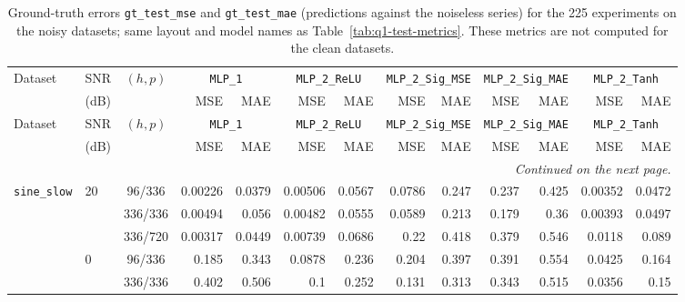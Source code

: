 \documentclass[12pt]{article}
\theoremstyle{definition}
\begin{document}
{\begin{enumerate}[label=\textbf{1.2.\arabic*}, leftmargin=*]
{\medskip
\begin{longtable}{@{}llc@{\hspace{6pt}}rr@{\hspace{8pt}}rr@{\hspace{8pt}}rr@{\hspace{8pt}}rr@{\hspace{8pt}}rr@{}}
\caption{Ground-truth errors \texttt{gt\_test\_mse} and \texttt{gt\_test\_mae} (predictions against the noiseless series) for the 225 experiments on the noisy datasets; same layout and model names as Table~\ref{tab:q1-test-metrics}. These metrics are not computed for the clean datasets.}\label{tab:q1-gt-metrics}\\
\toprule
Dataset & SNR & $(h,p)$ & \multicolumn{2}{c}{\texttt{MLP\_1}} & \multicolumn{2}{c}{\texttt{MLP\_2\_ReLU}} & \multicolumn{2}{c}{\texttt{MLP\_2\_Sig\_MSE}} & \multicolumn{2}{c}{\texttt{MLP\_2\_Sig\_MAE}} & \multicolumn{2}{c}{\texttt{MLP\_2\_Tanh}} \\
\cmidrule(lr){4-5}\cmidrule(lr){6-7}\cmidrule(lr){8-9}\cmidrule(lr){10-11}\cmidrule(lr){12-13}
 & (dB) &  & MSE & MAE & MSE & MAE & MSE & MAE & MSE & MAE & MSE & MAE \\
\midrule
\endfirsthead
\toprule
Dataset & SNR & $(h,p)$ & \multicolumn{2}{c}{\texttt{MLP\_1}} & \multicolumn{2}{c}{\texttt{MLP\_2\_ReLU}} & \multicolumn{2}{c}{\texttt{MLP\_2\_Sig\_MSE}} & \multicolumn{2}{c}{\texttt{MLP\_2\_Sig\_MAE}} & \multicolumn{2}{c}{\texttt{MLP\_2\_Tanh}} \\
\cmidrule(lr){4-5}\cmidrule(lr){6-7}\cmidrule(lr){8-9}\cmidrule(lr){10-11}\cmidrule(lr){12-13}
 & (dB) &  & MSE & MAE & MSE & MAE & MSE & MAE & MSE & MAE & MSE & MAE \\
\midrule
\endhead
\midrule
\multicolumn{13}{r}{\textit{Continued on the next page.}} \\
\endfoot
\bottomrule
\endlastfoot
\texttt{sine\_slow} & 20 & 96/336 & 0.00226 & 0.0379 & 0.00506 & 0.0567 & 0.0786 & 0.247 & 0.237 & 0.425 & 0.00352 & 0.0472 \\
 &  & 336/336 & 0.00494 & 0.056 & 0.00482 & 0.0555 & 0.0589 & 0.213 & 0.179 & 0.36 & 0.00393 & 0.0497 \\
 &  & 336/720 & 0.00317 & 0.0449 & 0.00739 & 0.0686 & 0.22 & 0.418 & 0.379 & 0.546 & 0.0118 & 0.089 \\
\addlinespace[2pt]
 & 0 & 96/336 & 0.185 & 0.343 & 0.0878 & 0.236 & 0.204 & 0.397 & 0.391 & 0.554 & 0.0425 & 0.164 \\
 &  & 336/336 & 0.402 & 0.506 & 0.1 & 0.252 & 0.131 & 0.313 & 0.343 & 0.515 & 0.0356 & 0.15 \\

\end{longtable}}
\end{enumerate}}
\end{document}
